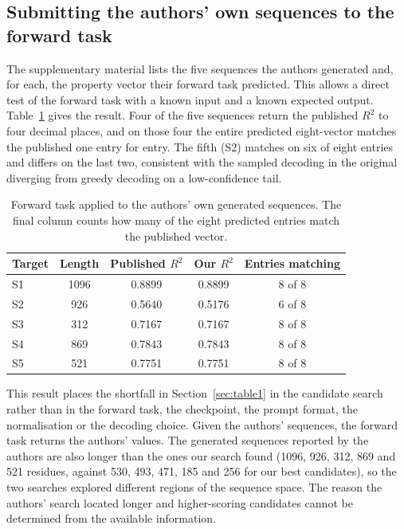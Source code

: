 \documentclass[11pt,a4paper]{article}
\begin{document}
\subsection{Submitting the authors' own sequences to the forward task}
\label{sec:exact}

The supplementary material lists the five sequences the authors generated and,
for each, the property vector their forward task predicted. This allows a direct
test of the forward task with a known input and a known expected output.
Table~\ref{tab:exact} gives the result. Four of the five sequences return the
published $R^2$ to four decimal places, and on those four the entire predicted
eight-vector matches the published one entry for entry. The fifth (S2) matches on
six of eight entries and differs on the last two, consistent with the sampled
decoding in the original diverging from greedy decoding on a low-confidence tail.

\begin{table}[htbp]
\centering
\small
\caption{Forward task applied to the authors' own generated sequences. The final
column counts how many of the eight predicted entries match the published vector.}
\label{tab:exact}
\begin{tabular}{lcccc}
\toprule
Target & Length & Published $R^2$ & Our $R^2$ & Entries matching \\
\midrule
S1 & 1096 & 0.8899 & 0.8899 & 8 of 8 \\
S2 & 926 & 0.5640 & 0.5176 & 6 of 8 \\
S3 & 312 & 0.7167 & 0.7167 & 8 of 8 \\
S4 & 869 & 0.7843 & 0.7843 & 8 of 8 \\
S5 & 521 & 0.7751 & 0.7751 & 8 of 8 \\
\bottomrule
\end{tabular}
\end{table}

This result places the shortfall in Section~\ref{sec:table1} in the candidate
search rather than in the forward task, the checkpoint, the prompt format, the
normalisation or the decoding choice. Given the authors' sequences, the forward
task returns the authors' values. The generated sequences reported by the
authors are also longer than the ones our search found (1096, 926, 312, 869 and
521 residues, against 530, 493, 471, 185 and 256 for our best candidates), so the
two searches explored different regions of the sequence space. The reason the
authors' search located longer and higher-scoring candidates cannot be
determined from the available information.
\end{document}
